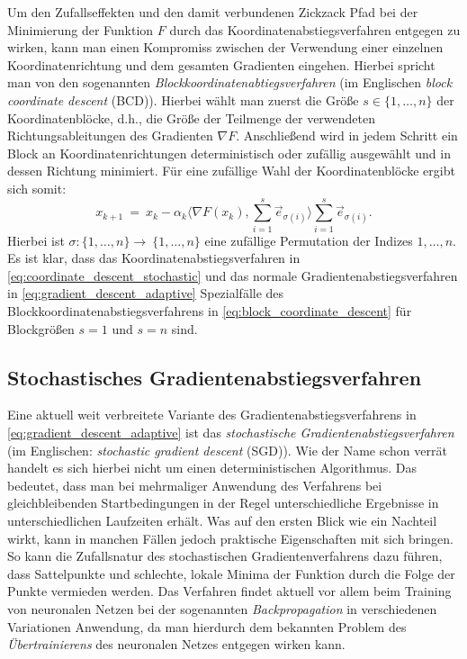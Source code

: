 \begin{remark}{}{}
Um den Zufallseffekten und den damit verbundenen Zickzack Pfad bei der Minimierung der Funktion $F$ durch das Koordinatenabstiegsverfahren entgegen zu wirken, kann man einen Kompromiss zwischen der Verwendung einer einzelnen Koordinatenrichtung und dem gesamten Gradienten eingehen. 
Hierbei spricht man von den sogenannten \textit{Blockkoordinatenabtiegsverfahren} (im Englischen \textit{block coordinate descent} (BCD)).
Hierbei wählt man zuerst die Größe $s \in \lbrace 1,\ldots,n\rbrace$ der Koordinatenblöcke, d.h., die Größe der Teilmenge der verwendeten Richtungsableitungen des Gradienten $\nabla F$. Anschließend wird in jedem Schritt ein Block an Koordinatenrichtungen deterministisch oder zufällig ausgewählt und in dessen Richtung minimiert.
Für eine zufällige Wahl der Koordinatenblöcke ergibt sich somit:
\begin{equation}
\label{eq:block_coordinate_descent}
x_{k+1} \ = \ x_k - \alpha_k \langle \nabla F(x_k), \sum_{i=1}^s\vec{e}_{\sigma(i)} \rangle \sum_{i=1}^s\vec{e}_{\sigma(i)}.
\end{equation}
Hierbei ist $\sigma \colon \lbrace1,\ldots,n\rbrace \rightarrow \ \lbrace1,\ldots,n\rbrace$ eine zufällige Permutation der Indizes $1,\ldots,n$.
Es ist klar, dass das Koordinatenabstiegsverfahren in \eqref{eq:coordinate_descent_stochastic} und das normale Gradientenabstiegsverfahren in \eqref{eq:gradient_descent_adaptive} Spezialfälle des Blockkoordinatenabstiegsverfahrens in \eqref{eq:block_coordinate_descent} für Blockgrößen $s = 1$ und $s=n$ sind.
\end{remark}

\subsection{Stochastisches Gradientenabstiegsverfahren}
\label{ss:stochastic_gradient_descent}
Eine aktuell weit verbreitete Variante des Gradientenabstiegsverfahrens in \eqref{eq:gradient_descent_adaptive} ist das \textit{stochastische Gradientenabstiegsverfahren} (im Englischen: \textit{stochastic gradient descent} (SGD)). 
Wie der Name schon verrät handelt es sich hierbei nicht um einen deterministischen Algorithmus.
Das bedeutet, dass man bei mehrmaliger Anwendung des Verfahrens bei gleichbleibenden Startbedingungen in der Regel unterschiedliche Ergebnisse in unterschiedlichen Laufzeiten erhält.
Was auf den ersten Blick wie ein Nachteil wirkt, kann in manchen Fällen jedoch praktische Eigenschaften mit sich bringen.
So kann die Zufallsnatur des stochastischen Gradientenverfahrens dazu führen, dass Sattelpunkte und schlechte, lokale Minima der Funktion durch die Folge der Punkte vermieden werden.
Das Verfahren findet aktuell vor allem beim Training von neuronalen Netzen bei der sogenannten \textit{Backpropagation} in verschiedenen Variationen Anwendung, da man hierdurch dem bekannten Problem des \textit{Übertrainierens} des neuronalen Netzes entgegen wirken kann.

